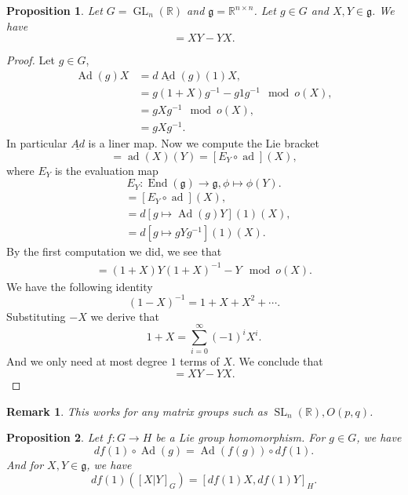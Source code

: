 \documentclass{article}
\newtheorem{proposition}{Proposition}[section]
\newtheorem{remark}{Remark}[section]
\numberwithin{equation}{section}
\DeclareMathOperator{\Ad}{Ad}
\DeclareMathOperator{\ad}{ad}
\DeclareMathOperator{\End}{End}
\DeclareMathOperator{\GL}{GL}
\DeclareMathOperator{\SL}{SL}
\begin{document}
\begin{proposition}
Let $G=\GL_n(\mathbb{R})$ and $\mathfrak{g}=\mathbb{R}^{n\times n}$. Let $g\in G$ and $X,Y\in\mathfrak{g}$. We have
\begin{equation*}
[X|Y] = XY-YX.
\end{equation*}
\end{proposition}

\begin{proof} Let $g\in G$, 
\begin{align*}
\Ad(g)X &= d\underline{\Ad}(g)(1)X,\\
& = g(1+X)g^{-1}-g1g^{-1}\mod{o(X)},\\
& = gXg^{-1}\mod{o(X)},\\
&=gXg^{-1}.
\end{align*}
In particular $\underline{Ad}$ is a liner map. Now we compute the Lie bracket
\begin{equation*}
[X|Y] = \ad(X)(Y) = [E_Y\circ\ad](X),
\end{equation*}
where $E_Y$ is the evaluation map 
\begin{equation*}
E_Y:\End(\mathfrak{g})\to\mathfrak{g}, \phi\mapsto\phi(Y).
\end{equation*}
\begin{align*}
[X|Y] & = [E_Y\circ\ad](X),\\
& = d[g\mapsto\Ad(g)Y](1)(X),\\
&=d[g\mapsto gYg^{-1}](1)(X).
\end{align*}
By the first computation we did, we see that
\begin{align*}
[X|Y] = (1+X)Y(1+X)^{-1}-Y\mod{o(X)}.
\end{align*}
We have the following identity
\begin{equation*}
(1-X)^{-1}=1+X+X^2+\cdots.
\end{equation*}
Substituting $-X$ we derive that
\begin{equation*}
1+X=\sum_{i=0}^\infty (-1)^iX^i.
\end{equation*}
And we only need at most degree $1$ terms of $X$. We conclude that
\begin{equation*}
[X|Y] =XY-YX.
\end{equation*}
\end{proof}

\begin{remark}
This works for any matrix groups such as $\SL_n(\mathbb{R}),O(p,q)$.
\end{remark}

\begin{proposition}
Let $f:G\to H$ be a Lie group homomorphism. For $g\in G$, we have
\begin{equation}
df(1)\circ\Ad(g)=\Ad(f(g))\circ df(1).
\label{nat_transform_gh}
\end{equation}
And for $X,Y\in\mathfrak{g}$, we have
\begin{equation}
df(1)([X|Y]_G)=[df(1)X,df(1)Y]_H.
\end{equation}
\label{comp_homo}
\end{proposition}
\end{document}
